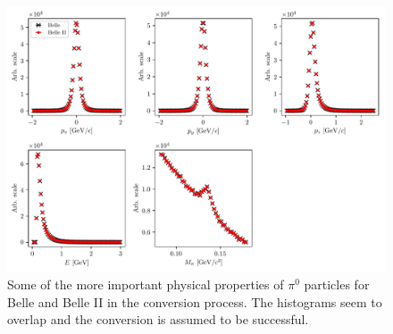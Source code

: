 \begin{figure}[H]
\centering
\captionsetup{width=0.8\linewidth}
\includegraphics[width=\linewidth]{fig/b2bii_pi0s}
\caption{Some of the more important physical properties of $\pi^0$ particles for Belle and Belle II in the conversion process. The histograms seem to overlap and the conversion is assumed to be successful.}
\label{fig:b2bii_pi0s}
\end{figure}

%
%
%
